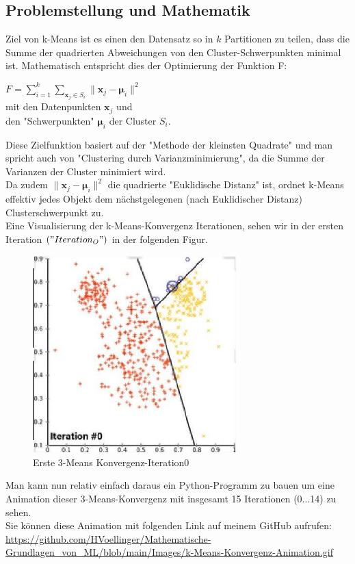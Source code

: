 \documentclass[12pt]{article}
\begin{document}
\subsection{Problemstellung und Mathematik}

Ziel von k-Means ist es einen den Datensatz so in $k$ Partitionen zu teilen, dass die Summe der quadrierten Abweichungen von den Cluster-Schwerpunkten minimal ist. Mathematisch entspricht dies der Optimierung der Funktion F:\\
\begin{center}
$ F = \sum_{i=1}^{k}  \sum_{\mathbf x_j \in S_{i}} {\| \mathbf x_j - \boldsymbol \mu_i \|^2}$ \\[0.2cm]
mit den Datenpunkten $ \mathbf x_j $ und \\
den "Schwerpunkten" $ \boldsymbol \mu_i $ der Cluster $ S_i $.\\[0.2cm]
\end{center}
%
Diese Zielfunktion basiert auf der "Methode der kleinsten Quadrate"  und man spricht auch von "Clustering durch Varianzminimierung", da die Summe der Varianzen der Cluster minimiert wird.\\[0.2cm]
Da zudem $ \| \mathbf x_j - \boldsymbol \mu_i \|^2 $ die quadrierte "Euklidische Distanz" ist, ordnet k-Means effektiv jedes Objekt dem nächstgelegenen (nach Euklidischer Distanz) Clusterschwerpunkt zu.\\ 
Eine Visualisierung der k-Means-Konvergenz Iterationen, sehen wir in der ersten Iteration $("Iteration_O")$ in der folgenden Figur.
\newpage
%
\begin{figure}[htp]
  \centering
  \hspace*{-0.1cm} 
  \includegraphics[width=0.7\textwidth]{K-Means_Konvergenz-Iteration0}
  \caption{Erste 3-Means Konvergenz-Iteration0}
  \label{fig:k-Means-Iteration0}
\end{figure}
%
%
Man kann nun relativ einfach daraus ein Python-Programm zu bauen um eine Animation dieser 3-Means-Konvergenz mit insgesamt 15 Iterationen (0...14) zu sehen.\\ 
Sie können diese Animation mit folgenden Link auf meinem GitHub aufrufen:\\
\url{https://github.com/HVoellinger/Mathematische-Grundlagen_von_ML/blob/main/Images/k-Means-Konvergenz-Animation.gif}\\
\end{document}
